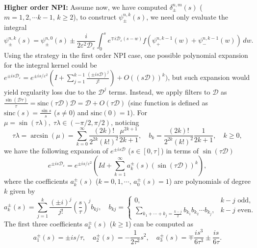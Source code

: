 \documentclass[final,leqno,showlabe]{siamltex}
\newcommand{\sinc}{{\text{sinc}}}
\begin{document}
{\bf{Higher order NPI:}}
Assume now, we have computed $\delta_{\pm}^{n,m}(s)$ ($m=1,2,\cdots k-1$, $k\ge 2$), to construct $\psi_{\pm}^{n,k}(s)$, we need only evaluate the integral
\begin{equation}\label{hnpi}
\psi_{\pm}^{n,k}(s)=\psi_{\pm}^{n,0}(s)\pm \frac{i}{2\varepsilon^2\mathcal{D}_{\varepsilon} }\int_0^s e^{\mp i \mathcal{D}_{\varepsilon} (s-w)} f(\psi_+^{n,k-1}(w)+\psi_-^{n,k-1}(w))\,dw.
\end{equation}
Using the strategy in the first order NPI case, one possible polynomial expansion for the integral kernel could be $e^{\pm is\mathcal{D}_\varepsilon}=e^{\pm is/\varepsilon^2} (I+\sum\limits_{j=1}^{k-1}\frac{(\pm is\mathcal{D})^{j}}{j!})+O((s\mathcal{D}))^k)$, but such expansion would yield regularity loss due to the  $\mathcal{D}^j$ terms. Instead, we apply filters to $\mathcal{D}$ as
$\frac{\sin(\mathcal{D}\tau)}{\tau}=\sinc(\tau \mathcal{D})\mathcal{D}=\mathcal{D}+O(\tau \mathcal{D})$  ({\rm sinc} function is defined as $\text{sinc}(s)=\frac{\sin s}{s}$ ($s\neq0$) and $\text{sinc}(0)=1$). For $\mu=\sin(\tau\lambda),\;\tau\lambda\in(-\pi/2,\pi/2)$, noticing
\begin{equation}
\tau \lambda=\arcsin(\mu)=\sum\limits_{k=0}^\infty \frac{(2k)!}{2^{2k}(k!)^2}\frac{\mu^{2k+1}}{2k+1},\quad b_k=\frac{(2k)!}{2^{2k}(k!)^2}\frac{1}{2k+1},
\quad k\ge0,
\end{equation}
 we
 have the following  expansion of $e^{\pm is\mathcal{D}}$ ($s\in[0,\tau]$) in terms of $\sin(\tau \mathcal{D})$
\begin{equation}\label{eq:expansion}
e^{\pm is \mathcal{D}_\varepsilon}=e^{\pm is/\varepsilon^2} \left(Id+\sum_{k=1}^\infty a_k^{\pm}(s)
 \left(\sin(\tau \mathcal{D})\right)^{k}\right),
\end{equation}
where the coefficients $a_k^{\pm}(s)$ ($k=0,1,\cdots$, $a_0^{\pm}(s)=1$) are polynomials  of degree $k$ given by
\begin{equation}
a_{k}^\pm(s)=\sum\limits_{j=1}^{k} \frac{(\pm i)^j}{j!}\left(\frac{s}{\tau}\right)^jb_{kj},\quad
b_{kj}=\begin{cases} 0,& k-j \text{ odd},\\
\sum\limits_{k_1+\cdots +k_j=\frac{k-j}{2}} b_{k_1}b_{k_2}\cdots b_{k_j},& k-j \text{ even}.
\end{cases}
\end{equation}
The first three coefficients $a_k^\pm(s)$ ($k\ge1$) can be computed as
\begin{equation}
a_1^\pm(s)=\pm i s/\tau,\quad a_2^\pm(s)=-\frac{1}{2\tau^2}s^2,\quad a_3^\pm(s)=\mp \frac{is^3}{6\tau^3} \pm\frac{is}{6\tau}.
\end{equation}
\end{document}
